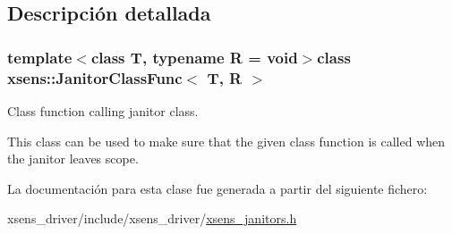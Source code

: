 \subsection{\-Descripción detallada}
\subsubsection*{template$<$class \-T, typename \-R = void$>$class xsens\-::\-Janitor\-Class\-Func$<$ T, R $>$}

\-Class function calling janitor class. 

\-This class can be used to make sure that the given class function is called when the janitor leaves scope. 

\-La documentación para esta clase fue generada a partir del siguiente fichero\-:\begin{DoxyCompactItemize}
\item 
xsens\-\_\-driver/include/xsens\-\_\-driver/\hyperlink{xsens__janitors_8h}{xsens\-\_\-janitors.\-h}\end{DoxyCompactItemize}

